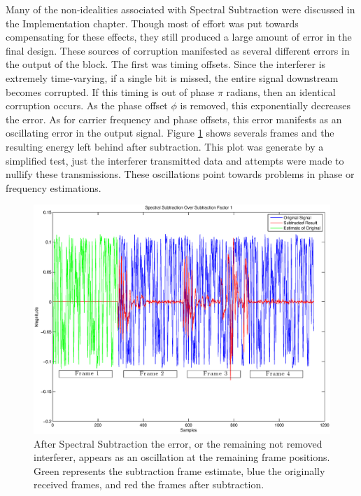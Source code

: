 Many of the non-idealities associated with Spectral Subtraction were discussed in the Implementation chapter.  Though most of effort was put towards compensating for these effects, they still produced a large amount of error in the final design.  These sources of corruption manifested as several different errors in the output of the block.  The first was timing offsets.  Since the interferer is extremely time-varying, if a single bit is missed, the entire signal downstream becomes corrupted.  If this timing is out of phase \(\pi\) radians, then an identical corruption occurs.  As the phase offset \(\phi\) is removed, this exponentially decreases the error.  As for carrier frequency and phase offsets, this error manifests as an oscillating error in the output signal.  Figure \ref{ss_oscillation} shows severals frames and the resulting energy left behind after subtraction.  This plot was generate by a simplified test, just the interferer transmitted data and attempts were made to nullify these transmissions.  These oscillations point towards problems in phase or frequency estimations.\\

\begin{figure}
\centering
\includegraphics[scale=0.5]{ss_oscillation.eps}
\caption{After Spectral Subtraction the error, or the remaining not removed interferer, appears as an oscillation at the remaining frame positions.  Green represents the subtraction frame estimate, blue the originally received frames, and red the frames after subtraction.}
\label{ss_oscillation}
\end{figure}


